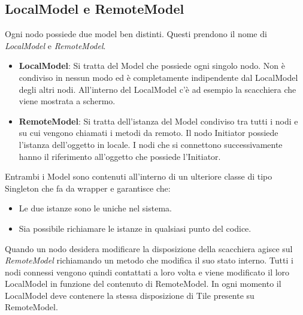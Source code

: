 \subsection{LocalModel e RemoteModel}
Ogni nodo possiede due model ben distinti. Questi prendono il nome di \textit{LocalModel} e \textit{RemoteModel}.
\begin{itemize}
    \item \textbf{LocalModel}: Si tratta del Model che possiede ogni singolo nodo. Non è condiviso in nessun modo ed è completamente indipendente dal LocalModel degli altri nodi. All'interno del LocalModel c'è ad esempio la scacchiera che viene mostrata a schermo.
    \item \textbf{RemoteModel}: Si tratta dell'istanza del Model condiviso tra tutti i nodi e su cui vengono chiamati i metodi da remoto. Il nodo Initiator possiede l'istanza dell'oggetto in locale. I nodi che si connettono successivamente hanno il riferimento all'oggetto che possiede l'Initiator.
\end{itemize}
Entrambi i Model sono contenuti all'interno di un ulteriore classe di tipo Singleton che fa da wrapper e garantisce che:
\begin{itemize}
    \item Le due istanze sono le uniche nel sistema.
    \item Sia possibile richiamare le istanze in qualsiasi punto del codice.
\end{itemize}
Quando un nodo desidera modificare la disposizione della scacchiera agisce sul \textit{RemoteModel} richiamando un metodo che modifica il suo stato interno. Tutti i nodi connessi vengono quindi contattati a loro volta e viene modificato il loro LocalModel in funzione del contenuto di RemoteModel.\newline
In ogni momento il LocalModel deve contenere la stessa disposizione di Tile presente su RemoteModel.
